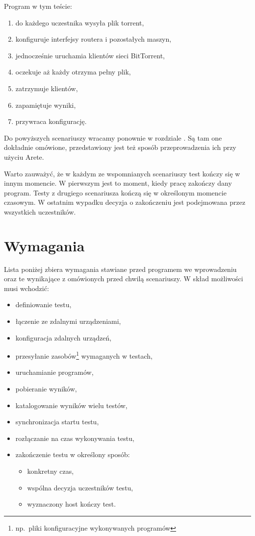 \documentclass[00-praca-magisterska.tex]{subfiles}
\begin{document}
Program w tym teście:
\begin{enumerate}
\item do każdego uczestnika wysyła plik torrent,
\item konfiguruje interfejsy routera i pozostałych maszyn,
\item jednocześnie uruchamia klientów sieci BitTorrent,
\item oczekuje aż każdy otrzyma pełny plik,
\item zatrzymuje klientów,
\item zapamiętuje wyniki,
\item przywraca konfigurację.
\end{enumerate}

Do powyższych scenariuszy wracamy ponownie w rozdziale . Są
tam one dokładnie omówione, przedstawiony jest też sposób przeprowadzenia ich
przy użyciu Arete.

Warto zauważyć, że w każdym ze wspomnianych scenariuszy test kończy się w
innym momencie. W pierwszym jest to moment, kiedy pracę zakończy dany program.
Testy z drugiego scenariusza kończą się w określonym momencie czasowym. W
ostatnim wypadku decyzja o zakończeniu jest podejmowana przez wszystkich
uczestników.

\section{Wymagania}
\label{arete-wymagania}

Lista poniżej zbiera wymagania stawiane przed programem we wprowadzeniu oraz te
wynikające z omówionych przed chwilą scenariuszy. W skład możliwości musi wchodzić:
\begin{itemize}
\item definiowanie testu,
\item łączenie ze zdalnymi urządzeniami,
\item konfiguracja zdalnych urządzeń,
\item przesyłanie zasobów\footnote{np.~pliki konfiguracyjne wykonywanych programów}  wymaganych w testach,
\item uruchamianie programów,
\item pobieranie wyników,
\item katalogowanie wyników wielu testów,
\item synchronizacja startu testu,
\item rozłączanie na czas wykonywania testu,
\item zakończenie testu w określony sposób:
  \begin{itemize}
  \item konkretny czas,
  \item wspólna decyzja uczestników testu,
  \item wyznaczony host kończy test.
  \end{itemize}
\end{itemize}
\end{document}
